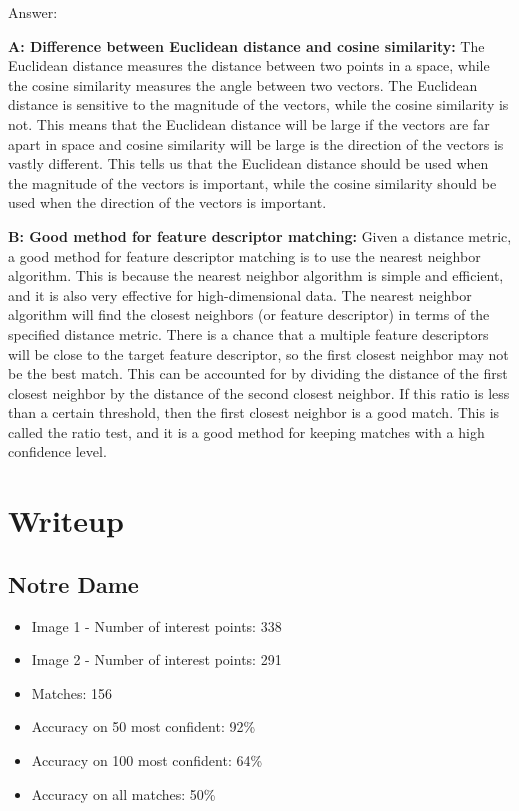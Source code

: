 \documentclass{article}
\begin{document}
Answer:

\textbf{A: Difference between Euclidean distance and cosine similarity: } The Euclidean distance measures the distance between two points in a space, while the cosine similarity measures the angle between two vectors. The Euclidean distance is sensitive to the magnitude of the vectors, while the cosine similarity is not. This means that the Euclidean distance will be large if the vectors are far apart in space and cosine similarity will be large is the direction of the vectors is vastly different. This tells us that the Euclidean distance should be used when the magnitude of the vectors is important, while the cosine similarity should be used when the direction of the vectors is important. 

\textbf{B: Good method for feature descriptor matching: } Given a distance metric, a good method for feature descriptor matching is to use the nearest neighbor algorithm. This is because the nearest neighbor algorithm is simple and efficient, and it is also very effective for high-dimensional data. The nearest neighbor algorithm will find the closest neighbors (or feature descriptor) in terms of the specified distance metric. There is a chance that a multiple feature descriptors will be close to the target feature descriptor, so the first closest neighbor may not be the best match. This can be accounted for by dividing the distance of the first closest neighbor by the distance of the second closest neighbor. If this ratio is less than a certain threshold, then the first closest neighbor is a good match. This is called the ratio test, and it is a good method for keeping matches with a high confidence level.

\section{Writeup}

\subsection{Notre Dame}
\begin{itemize}
    \item Image 1 - Number of interest points: 338
    \item Image 2 - Number of interest points: 291
    \item Matches: 156
    \item Accuracy on 50 most confident: 92\%
    \item Accuracy on 100 most confident: 64\%
    \item Accuracy on all matches: 50\%
\end{itemize}
\end{document}
